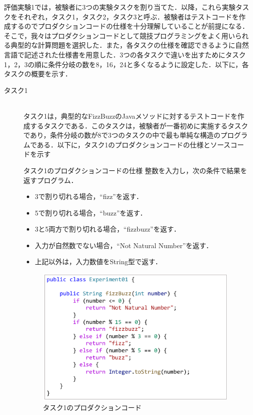 \documentclass[12pt]{jarticle} %
\begin{document}
評価実験1では，被験者に3つの実験タスクを割り当てた．以降，これら実験タスクをそれぞれ，タスク1，タスク2，タスク3と呼ぶ．被験者はテストコードを作成するのでプロダクションコードの仕様を十分理解していることが前提になる．そこで，我々はプロダクションコードとして競技プログラミングをよく用いられる典型的な計算問題を選択した．また，各タスクの仕様を確認できるように自然言語で記述された仕様書を用意した．3つの各タスクで違いを出すためにタスク1，2，3の順に条件分岐の数を8，16，24と多くなるように設定した．以下に，各タスクの概要を示す．

\begin{description}
\item[タスク1]~\\
タスク1は，典型的なFizzBuzzのJavaメソッドに対するテストコードを作成するタスクである．このタスクは，被験者が一番初めに実施するタスクであり，条件分岐の数が8で3つのタスクの中で最も単純な構造のプログラムである．以下に，タスク1のプロダクションコードの仕様とソースコードを示す

\begin{itembox}[l]{タスク1のプロダクションコードの仕様}
整数を入力し，次の条件で結果を返すプログラム．
\begin{itemize}
\item 3で割り切れる場合，``fizz''を返す．
\item 5で割り切れる場合，``buzz''を返す．
\item 3と5両方で割り切れる場合，``fizzbuzz''を返す．
\item 入力が自然数でない場合，``Not Natural Number''を返す．
\item 上記以外は，入力数値をString型で返す．
\end{itemize}
\end{itembox}

\begin{figure}[htbp]
  \begin{center}
    \includegraphics[clip,width=10cm]{E1.pdf}
    \caption{タスク1のプロダクションコード}
    \label{E1}
  \end{center}
\end{figure}


\end{description}
\end{document}
